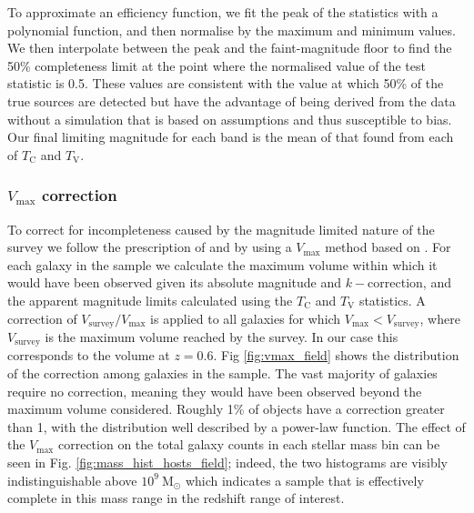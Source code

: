 \documentclass[fleqn,usenatbib]{mnras}
\begin{document}
To approximate an efficiency function, we fit the peak of the statistics with a polynomial function, and then normalise by the maximum and minimum values. We then interpolate between the peak and the faint-magnitude floor to find the 50\% completeness limit at the point where the normalised value of the test statistic is 0.5. These values are consistent with the value at which 50\% of the true sources are detected but have the advantage of being derived from the data without a simulation that is based on assumptions and thus susceptible to bias. Our final limiting magnitude for each band is the mean of that found from each of  $T_{\mathrm{C}}$ and $T_{\mathrm{V}}$.
\subsubsection{$V_{\mathrm{max}}$ correction \label{subsubsec:vmax_corr}}

To correct for incompleteness caused by the magnitude limited nature of the survey we follow the prescription of \citet{Sullivan2006} and \citet{Smith2012} by using a $V_{\mathrm{max}}$ method based on \citet{Schmidt1968}. For each galaxy in the sample we calculate the maximum volume within which it would have been observed given its absolute magnitude and $k-$correction, and the apparent magnitude limits calculated using the $T_{\mathrm{C}}$ and $T_{\mathrm{V}}$ statistics. A correction of $V_{\mathrm{survey}}/V_{\mathrm{max}}$ is applied to all galaxies for which $V_{\mathrm{max}} < V_{\mathrm{survey}}$, where $V_{\mathrm{survey}}$ is the maximum volume reached by the survey. In our case this corresponds to the volume at $z=0.6$. Fig \ref{fig:vmax_field} shows the distribution of the correction among galaxies in the sample. The vast majority of galaxies require no correction, meaning they would have been observed beyond the maximum volume considered. Roughly 1\% of objects have a correction greater than 1, with the distribution well described by a power-law function. The effect of the $V_{\mathrm{max}}$ correction on the total galaxy counts in each stellar mass bin can be seen in Fig. \ref{fig:mass_hist_hosts_field}; indeed, the two histograms are visibly indistinguishable above $10^9~\mathrm{M}_{\odot}$ which indicates a sample that is effectively complete in this mass range in the redshift range of interest.

\end{document}
